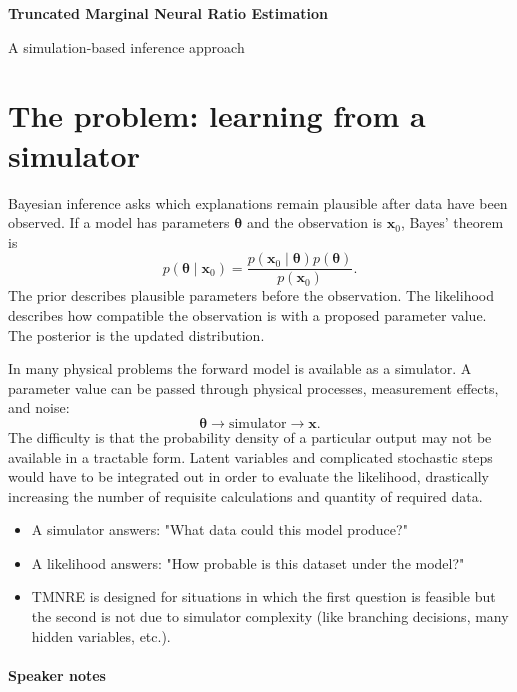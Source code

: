 ﻿\documentclass[13pt,a4paper]{article}
\begin{document}
\begin{center}
{\large\bfseries Truncated Marginal Neural Ratio Estimation}
\par
{\normalsize A simulation-based inference approach}
\end{center}

\section*{The problem: learning from a simulator}

Bayesian inference asks which explanations remain plausible after data have been observed. If a model has parameters $\bm{\theta}$ and the observation is $\bm{x}_0$, Bayes' theorem is
\begin{equation}
p(\bm{\theta}\mid\bm{x}_0)=
\frac{p(\bm{x}_0\mid\bm{\theta})p(\bm{\theta})}{p(\bm{x}_0)}.
\end{equation}
The prior describes plausible parameters before the observation. The likelihood describes how compatible the observation is with a proposed parameter value. The posterior is the updated distribution.

In many physical problems the forward model is available as a simulator. A parameter value can be passed through physical processes, measurement effects, and noise:
\[
\bm{\theta}\longrightarrow\text{simulator}\longrightarrow\bm{x}.
\]
The difficulty is that the probability density of a particular output may not be available in a tractable form. Latent variables and complicated stochastic steps would have to be integrated out in order to evaluate the likelihood, drastically increasing the number of requisite calculations and quantity of required data.

\begin{itemize}
\item A simulator answers: "What data could this model produce?"
\item A likelihood answers: "How probable is this dataset under the model?"
\item TMNRE is designed for situations in which the first question is feasible but the second is not due to simulator complexity (like branching decisions, many hidden variables, etc.).
\end{itemize}

\paragraph{Speaker notes}
\end{document}
